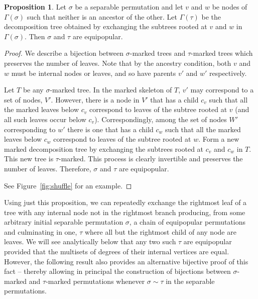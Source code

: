 \documentclass[10pt]{article}
\theoremstyle{definition}
\newtheorem{proposition}{Proposition}
\numberwithin{equation}{section}
\numberwithin{figure}{section}
\newcommand{\todoMA}[1]{\todo[inline, color=red]{MA: #1}}
\begin{document}
\begin{proposition} \label{prop:node_switch}
Let $\sigma$ be a separable permutation and let $v$ and $w$ be nodes of $\Gamma(\sigma)$ such that neither is an ancestor of the other. Let $\Gamma(\tau)$ be the decomposition tree obtained by exchanging the subtrees rooted at $v$ and $w$ in $\Gamma(\sigma)$. Then $\sigma$ and $\tau$ are equipopular.
\end{proposition}

\begin{proof}
We describe a bijection between $\sigma$-marked trees and $\tau$-marked trees which preserves the number of leaves.  Note that by the ancestry condition, both $v$ and $w$ must be internal nodes or leaves, and so have parents $v'$ and $w'$ respectively.
    
Let $T$ be any $\sigma$-marked tree. In the marked skeleton of $T$, $v'$ may correspond to a set of nodes, $V'$. However, there is a node in $V'$ that has a child $c_v$ such that all the marked leaves below $c_v$ correspond to leaves of the subtree rooted at $v$ (and all such leaves occur below $c_v$). Correspondingly, among the set of nodes $W'$ corresponding to $w'$ there is one that has a child $c_w$ such that all the marked leaves below $c_w$ correspond to leaves of the subtree rooted at $w$. Form a new marked decomposition tree by exchanging the subtrees rooted at $c_v$ and $c_w$ in $T$. This new tree is $\tau$-marked. This process is clearly invertible and preserves the number of leaves. Therefore, $\sigma$ and $\tau$ are equipopular. 

See Figure~\ref{fig:shuffle} for an example. 
\end{proof}


Using just this proposition, we can repeatedly exchange the rightmost leaf of a tree with any internal node not in the rightmost branch producing, from some arbitrary initial separable permutation $\sigma$, a chain of equipopular permutations and culminating in one, $\tau$ where all but the rightmost child of any node are leaves. We will see analytically below that any two such $\tau$ are equipopular provided that the multisets of degrees of their internal vertices are equal. However, the following result also provides an alternative bijective proof of this fact -- thereby allowing in principal the construction of bijections between $\sigma$-marked and $\tau$-marked permutations whenever $\sigma \sim \tau$ in the separable permutations.
\end{document}
